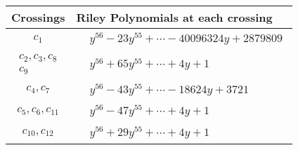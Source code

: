\documentclass[1p]{elsarticle_modified}
\theoremstyle{definition}
\begin{document}
\begin{tabular}{m{50pt}|m{274pt}}
Crossings & \hspace{64pt}Riley Polynomials at each crossing \\
\hline $$\begin{aligned}c_{1}\end{aligned}$$&$\begin{aligned}
&y^{56}-23 y^{55}+\cdots-40096324 y+2879809
\end{aligned}$\\
\hline $$\begin{aligned}c_{2},c_{3},c_{8}\\c_{9}\end{aligned}$$&$\begin{aligned}
&y^{56}+65 y^{55}+\cdots+4 y+1
\end{aligned}$\\
\hline $$\begin{aligned}c_{4},c_{7}\end{aligned}$$&$\begin{aligned}
&y^{56}-43 y^{55}+\cdots-18624 y+3721
\end{aligned}$\\
\hline $$\begin{aligned}c_{5},c_{6},c_{11}\end{aligned}$$&$\begin{aligned}
&y^{56}-47 y^{55}+\cdots+4 y+1
\end{aligned}$\\
\hline $$\begin{aligned}c_{10},c_{12}\end{aligned}$$&$\begin{aligned}
&y^{56}+29 y^{55}+\cdots+4 y+1
\end{aligned}$\\
\hline
\end{tabular}
\vskip 2pc
\end{document}
